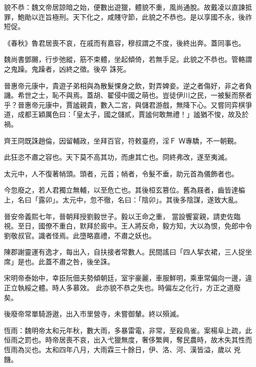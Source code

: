 \begin{pinyinscope}
 貌不恭：魏文帝居諒暗之始，便數出遊獵，體貌不重，風尚通脫。故戴凌以直諫抵罪，鮑勛以迕旨極刑。天下化之，咸賤守節，此貌之不恭也。是以享國不永，後祚短促。



 《春秋》魯君居喪不哀，在戚而有嘉容，穆叔謂之不度，後終出奔。蓋同事也。



 魏尚書鄧颺，行步弛縱，筋不束體，坐起傾倚，若無手足。此貌之不恭也。管輅謂之鬼躁。鬼躁者，凶終之徵。後卒
 誅死。



 晉惠帝元康中，貴遊子弟相與為散髮惈身之飲，對弄婢妾。逆之者傷好，非之者負譏。希世之士，恥不與焉。蓋胡、翟侵中國之萌也。豈徒伊川之民，一被髮而祭者乎？晉惠帝元康中，賈謐親貴，數入二宮，與儲君游戲，無降下心。又嘗同弈棋爭道，成都王穎厲色曰：「皇太子，國之儲貳，賈謐何敢無禮！」謐猶不悛，故及於禍。



 齊王冏既誅趙倫，因留輔政，坐拜百官，符敕臺府，淫Ｆ
 Ｗ專驕，不一朝覲。



 此狂恣不肅之容也。天下莫不高其功，而慮其亡也。冏終弗改，遂至夷滅。



 太元中，人不復著帩頭。頭者，元首；帩者，令髮不垂，助元首為儀飾者也。



 今忽廢之，若人君獨立無輔，以至危亡也。其後桓玄篡位。舊為屐者，齒皆達楄上，名曰「露卯」。太元中，忽不徹，名曰：「陰卯」。其後多陰謀，遂致大亂。



 晉安帝義熙七年，晉朝拜授劉毅世子。毅以王命之重，
 當設饗宴親，請吏佐臨視。至日，國僚不重白，默拜於廄中。王人將反命，毅方知，大以為恨，免郎中令劉敬叔官。識者怪焉。此墮略嘉禮，不肅之妖也。



 陳郡謝靈運有逸才，每出入，自扶接者常數人。民間謠曰「四人挈衣裙，三人捉坐席」是也。此蓋不肅之咎，後坐誅。



 宋明帝泰始中，幸臣阮佃夫勢傾朝廷，室宇豪麗，車服鮮明，乘車常偏向一邊，違正立執綏之體。時人多慕效。
 此亦貌不恭之失也。時偏左之化行，方正之道廢矣。



 後廢帝常單騎游遨，出入市里營寺，未嘗御輦。終以殞滅。



 恆雨：魏明帝太和元年秋，數大雨，多暴雷電，非常，至殺鳥雀。案楊阜上疏，此恒雨之罰也。時帝居喪不哀，出入弋獵無度，奢侈繁興，奪民農時，故木失其性而恆雨為災也。太和四年八月，大雨霖三十餘日，伊、洛、河、漢皆溢，歲以
 兇饑。




\end{pinyinscope}
